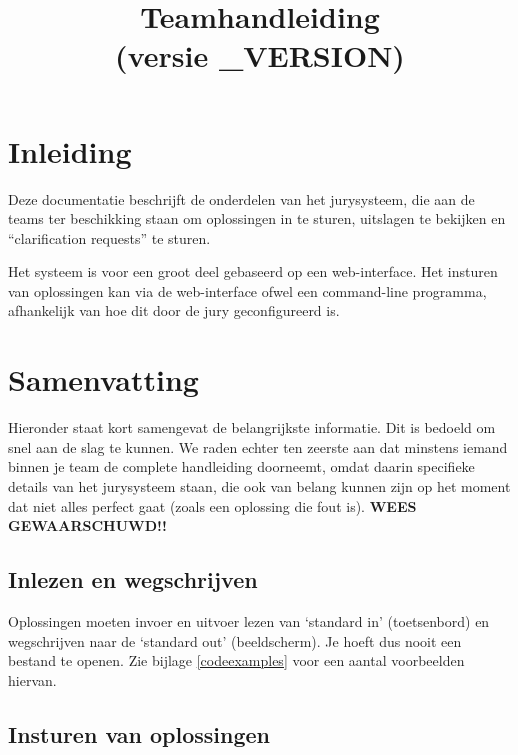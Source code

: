 

\usepackage[dutch]{babel}

\title{Teamhandleiding \DOMjudge\\(versie \DOMJUDGE_VERSION)}



\domjudgetitlepage

\newpage
\tableofcontents

\newpage
\section{Inleiding}

Deze documentatie beschrijft de onderdelen van het \DOMjudge
jurysysteem, die aan de teams ter beschikking staan om oplossingen in
te sturen, uitslagen te bekijken en ``clarification requests'' te
sturen.

Het systeem is voor een groot deel gebaseerd op een web-interface. Het
insturen van oplossingen kan via de web-interface ofwel een
command-line programma, afhankelijk van hoe dit door de jury
geconfigureerd is.

\section{Samenvatting}

Hieronder staat kort samengevat de belangrijkste informatie. Dit is
bedoeld om snel aan de slag te kunnen. We raden echter ten zeerste
aan dat minstens iemand binnen je team de complete handleiding
doorneemt, omdat daarin specifieke details van het jurysysteem staan,
die ook van belang kunnen zijn op het moment dat niet alles perfect
gaat (zoals een oplossing die fout is). \textbf{WEES GEWAARSCHUWD!!}

\subsection{Inlezen en wegschrijven}

Oplossingen moeten invoer en uitvoer lezen van `standard in'
(toetsenbord) en wegschrijven naar de `standard out' (beeldscherm).
Je hoeft dus nooit een bestand te openen. Zie bijlage
\ref{codeexamples} voor een aantal voorbeelden hiervan.

\subsection{Insturen van oplossingen}

